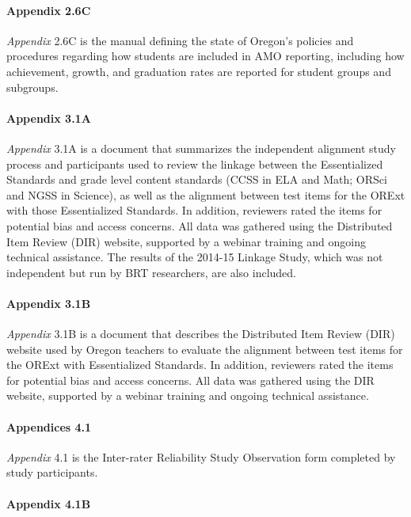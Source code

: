 \documentclass[]{article}
\let\oldparagraph\paragraph
\renewcommand{\paragraph}[1]{\oldparagraph{#1}\mbox{}}
\begin{document}
\paragraph{Appendix 2.6C}\label{appendix-2.6c}

\emph{Appendix} 2.6C is the manual defining the state of Oregon's
policies and procedures regarding how students are included in AMO
reporting, including how achievement, growth, and graduation rates are
reported for student groups and subgroups.

\paragraph{Appendix 3.1A}\label{appendix-3.1a}

\emph{Appendix} 3.1A is a document that summarizes the independent
alignment study process and participants used to review the linkage
between the Essentialized Standards and grade level content standards
(CCSS in ELA and Math; ORSci and NGSS in Science), as well as the
alignment between test items for the ORExt with those Essentialized
Standards. In addition, reviewers rated the items for potential bias and
access concerns. All data was gathered using the Distributed Item Review
(DIR) website, supported by a webinar training and ongoing technical
assistance. The results of the 2014-15 Linkage Study, which was not
independent but run by BRT researchers, are also included.

\paragraph{Appendix 3.1B}\label{appendix-3.1b}

\emph{Appendix} 3.1B is a document that describes the Distributed Item
Review (DIR) website used by Oregon teachers to evaluate the alignment
between test items for the ORExt with Essentialized Standards. In
addition, reviewers rated the items for potential bias and access
concerns. All data was gathered using the DIR website, supported by a
webinar training and ongoing technical assistance.

\paragraph{Appendices 4.1}\label{appendices-4.1}

\emph{Appendix} 4.1 is the Inter-rater Reliability Study Observation
form completed by study participants.

\paragraph{Appendix 4.1B}\label{appendix-4.1b}
\end{document}
